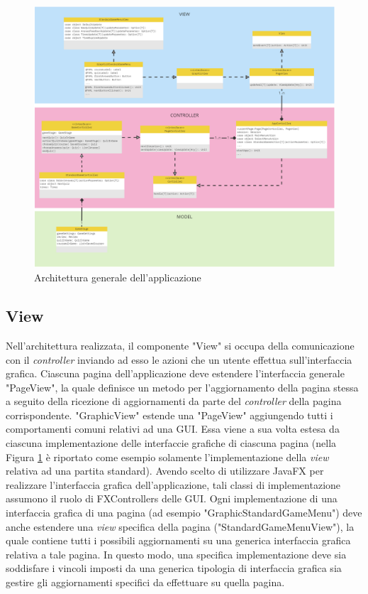     \begin{figure}[H]
        \centering
        \includegraphics[width=\textwidth]{Miro/general_architecture.png}
        \caption{Architettura generale dell'applicazione}
        \label{fig:mvc-generale}
    \end{figure}
    
    \subsection{View}
        Nell'architettura realizzata, il componente "View" si occupa della comunicazione con il \textit{controller} inviando ad esso le azioni che un utente effettua sull'interfaccia grafica. Ciascuna pagina dell'applicazione deve estendere l'interfaccia generale "PageView", la quale definisce un metodo per l'aggiornamento della pagina stessa a seguito della ricezione di aggiornamenti da parte del \textit{controller} della pagina corrispondente. "GraphicView" estende una "PageView" aggiungendo tutti i comportamenti comuni relativi ad una GUI. Essa viene a sua volta estesa da ciascuna implementazione delle interfaccie grafiche di ciascuna pagina (nella Figura \ref{fig:mvc-generale} è riportato come esempio solamente l'implementazione della \textit{view} relativa ad una partita standard). Avendo scelto di utilizzare JavaFX per realizzare l'interfaccia grafica dell'applicazione, tali classi di implementazione assumono il ruolo di FXControllers delle GUI. Ogni implementazione di una interfaccia grafica di una pagina (ad esempio "GraphicStandardGameMenu") deve anche estendere una \textit{view} specifica della pagina ("StandardGameMenuView"), la quale contiene tutti i possibili aggiornamenti su una generica interfaccia grafica relativa a tale pagina. In questo modo, una specifica implementazione deve sia soddisfare i vincoli imposti da una generica tipologia di interfaccia grafica sia gestire gli aggiornamenti specifici da effettuare su quella pagina.
        

